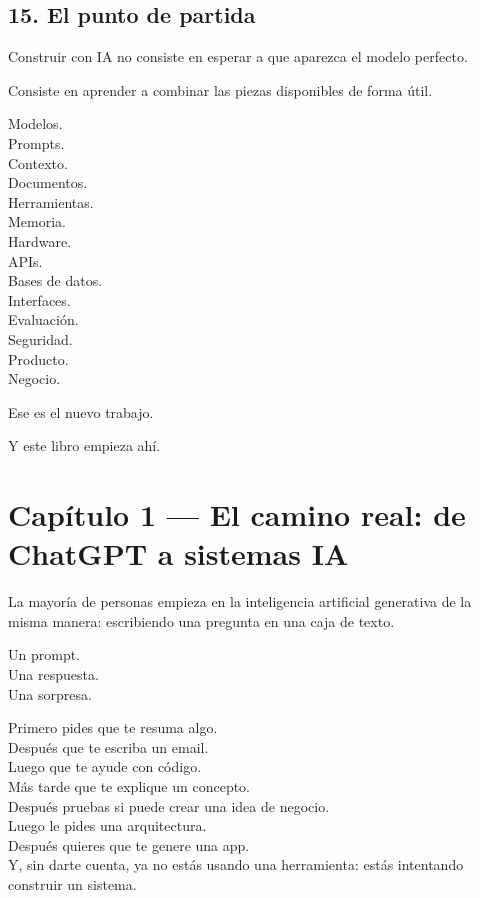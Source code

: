 \section{15. El punto de partida}\label{el-punto-de-partida}

Construir con IA no consiste en esperar a que aparezca el modelo
perfecto.

Consiste en aprender a combinar las piezas disponibles de forma útil.

Modelos.\\
Prompts.\\
Contexto.\\
Documentos.\\
Herramientas.\\
Memoria.\\
Hardware.\\
APIs.\\
Bases de datos.\\
Interfaces.\\
Evaluación.\\
Seguridad.\\
Producto.\\
Negocio.

Ese es el nuevo trabajo.

Y este libro empieza ahí.

\newpage

\chapter{Capítulo 1 --- El camino real: de ChatGPT a sistemas
IA}\label{capuxedtulo-1-el-camino-real-de-chatgpt-a-sistemas-ia}

La mayoría de personas empieza en la inteligencia artificial generativa
de la misma manera: escribiendo una pregunta en una caja de texto.

Un prompt.\\
Una respuesta.\\
Una sorpresa.

Primero pides que te resuma algo.\\
Después que te escriba un email.\\
Luego que te ayude con código.\\
Más tarde que te explique un concepto.\\
Después pruebas si puede crear una idea de negocio.\\
Luego le pides una arquitectura.\\
Después quieres que te genere una app.\\
Y, sin darte cuenta, ya no estás usando una herramienta: estás
intentando construir un sistema.

